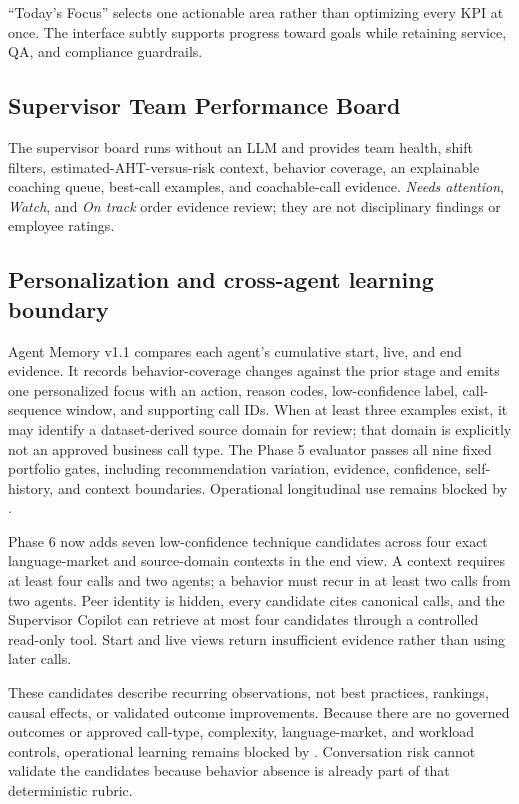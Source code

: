 \documentclass[11pt,letterpaper]{article}
\begin{document}
``Today's Focus'' selects one actionable area rather than optimizing every KPI at once.
The interface subtly supports progress toward goals while retaining service, QA, and
compliance guardrails.

\subsection{Supervisor Team Performance Board}

The supervisor board runs without an LLM and provides team health, shift filters,
estimated-AHT-versus-risk context, behavior coverage, an explainable coaching queue,
best-call examples, and coachable-call evidence. \textit{Needs attention},
\textit{Watch}, and \textit{On track} order evidence review; they are not disciplinary
findings or employee ratings.

\subsection{Personalization and cross-agent learning boundary}

Agent Memory v1.1 compares each agent's cumulative start, live, and end evidence. It
records behavior-coverage changes against the prior stage and emits one personalized
focus with an action, reason codes, low-confidence label, call-sequence window, and
supporting call IDs. When at least three examples exist, it may identify a
dataset-derived source domain for review; that domain is explicitly not an approved
business call type. The Phase 5 evaluator passes all nine fixed portfolio gates,
including recommendation variation, evidence, confidence, self-history, and context
boundaries. Operational longitudinal use remains blocked by
.

Phase 6 now adds seven low-confidence technique candidates across four exact
language-market and source-domain contexts in the end view. A context requires at
least four calls and two agents; a behavior must recur in at least two calls from two
agents. Peer identity is hidden, every candidate cites canonical calls, and the
Supervisor Copilot can retrieve at most four candidates through a controlled read-only
tool. Start and live views return insufficient evidence rather than using later calls.

These candidates describe recurring observations, not best practices, rankings,
causal effects, or validated outcome improvements. Because there are no governed
outcomes or approved call-type, complexity, language-market, and workload controls,
operational learning remains blocked by
. Conversation risk cannot validate
the candidates because behavior absence is already part of that deterministic rubric.
\end{document}
